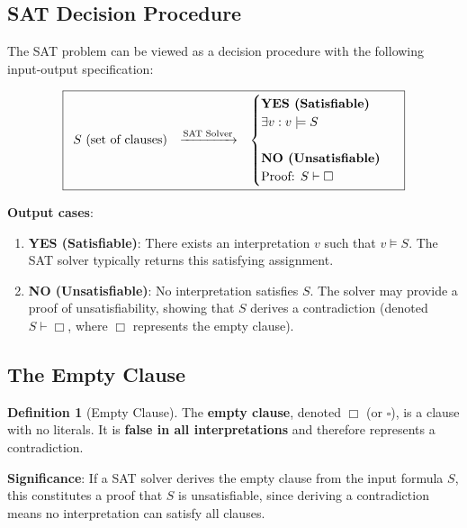 \documentclass[11pt,a4paper]{article}
\theoremstyle{definition}
\newtheorem{definition}{Definition}[section]
\theoremstyle{plain}
\theoremstyle{remark}
\begin{document}
\subsection{SAT Decision Procedure}

The SAT problem can be viewed as a decision procedure with the following input-output specification:

\[
\boxed{
\begin{array}{ccc}
S \text{ (set of clauses)} & \xrightarrow{\text{SAT Solver}} & 
\begin{cases}
\text{\textbf{YES (Satisfiable)}} \\
\exists v: v \models S \\
\\
\text{\textbf{NO (Unsatisfiable)}} \\
\text{Proof: } S \vdash \Box
\end{cases}
\end{array}
}
\]

\textbf{Output cases}:
\begin{enumerate}
    \item \textbf{YES (Satisfiable)}: There exists an interpretation $v$ such that $v \models S$. The SAT solver typically returns this satisfying assignment.
    
    \item \textbf{NO (Unsatisfiable)}: No interpretation satisfies $S$. The solver may provide a proof of unsatisfiability, showing that $S$ derives a contradiction (denoted $S \vdash \Box$, where $\Box$ represents the empty clause).
\end{enumerate}

\subsection{The Empty Clause}

\begin{tcolorbox}[colback=red!5!white,colframe=red!75!black,title=\textbf{Empty Clause}]
\begin{definition}[Empty Clause]
The \textbf{empty clause}, denoted $\Box$ (or $\square$), is a clause with no literals. It is \textbf{false in all interpretations} and therefore represents a contradiction.
\end{definition}
\end{tcolorbox}

\textbf{Significance}: If a SAT solver derives the empty clause from the input formula $S$, this constitutes a proof that $S$ is unsatisfiable, since deriving a contradiction means no interpretation can satisfy all clauses.
\end{document}
